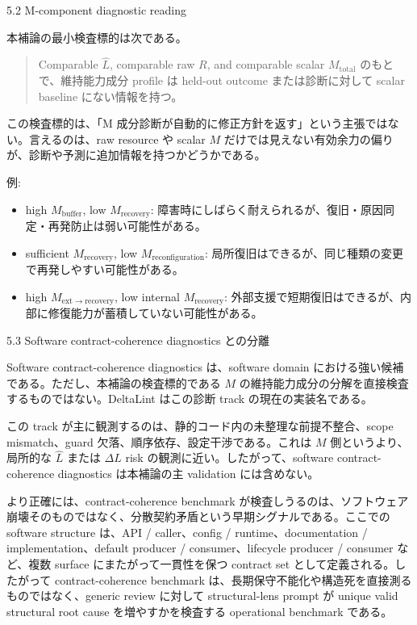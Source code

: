 \documentclass[12pt,a4paper]{article}
\begin{document}
5.2 M-component diagnostic reading

本補論の最小検査標的は次である。

\begin{quote}
Comparable $\hat L$, comparable raw $R$, and comparable scalar $M_{\mathrm{total}}$ のもとで、維持能力成分 profile は held-out outcome または診断に対して scalar baseline にない情報を持つ。
\end{quote}

この検査標的は、「M 成分診断が自動的に修正方針を返す」という主張ではない。言えるのは、raw resource や scalar \(M\) だけでは見えない有効余力の偏りが、診断や予測に追加情報を持つかどうかである。

例:

\begin{itemize}
\tightlist
\item
  high \(M_{\mathrm{buffer}}\), low \(M_{\mathrm{recovery}}\): 障害時にしばらく耐えられるが、復旧・原因同定・再発防止は弱い可能性がある。
\item
  sufficient \(M_{\mathrm{recovery}}\), low \(M_{\mathrm{reconfiguration}}\): 局所復旧はできるが、同じ種類の変更で再発しやすい可能性がある。
\item
  high \(M_{\mathrm{ext}\to\mathrm{recovery}}\), low internal \(M_{\mathrm{recovery}}\): 外部支援で短期復旧はできるが、内部に修復能力が蓄積していない可能性がある。
\end{itemize}

5.3 Software contract-coherence diagnostics との分離

Software contract-coherence diagnostics は、software domain における強い候補である。ただし、本補論の検査標的である \(M\) の維持能力成分の分解を直接検査するものではない。DeltaLint はこの診断 track の現在の実装名である。

この track が主に観測するのは、静的コード内の未整理な前提不整合、scope mismatch、guard 欠落、順序依存、設定干渉である。これは \(M\) 側というより、局所的な \(\hat L\) または \(\Delta L\) risk の観測に近い。したがって、software contract-coherence diagnostics は本補論の主 validation には含めない。

より正確には、contract-coherence benchmark が検査しうるのは、ソフトウェア崩壊そのものではなく、分散契約矛盾という早期シグナルである。ここでの software structure は、API / caller、config / runtime、documentation / implementation、default producer / consumer、lifecycle producer / consumer など、複数 surface にまたがって一貫性を保つ contract set として定義される。したがって contract-coherence benchmark は、長期保守不能化や構造死を直接測るものではなく、generic review に対して structural-lens prompt が unique valid structural root cause を増やすかを検査する operational benchmark である。
\end{document}
